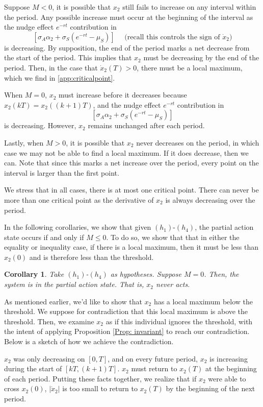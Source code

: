 \documentclass[preprint,12pt]{elsarticle}
\newtheorem{cor}{Corollary}
\begin{document}
Suppose $M < 0 $, it is possible that $x_2$ still fails to increase on any interval within the period. Any possible increase must occur at the beginning of the interval as the nudge effect $e^{-rt}$ contribution in \[
[\sigma_A\alpha_2 + \sigma_S(e^{-rt} - \mu_S)] \quad \text{ (recall this controls the sign of } \dot x_2)
\]
is decreasing. By supposition, the end of the period marks a net decrease from the start of the period. This implies that $x_2$ must be decreasing by the end of the period. Then, in the case that $\dot x_2(T) > 0$, there must be a local maximum, which we find in \ref{app:criticalpoint}. 



When $M = 0$, $x_2$ must increase before it decreases because $x_2(kT) =  x_2((k+1)T)$, and the nudge effect $e^{-rt}$ contribution in \[
[\sigma_A\alpha_2 + \sigma_S(e^{-rt} - \mu_S)]
\]
is decreasing. However, $x_2$ remains unchanged after each period.

Lastly, when $M>0$, it is possible that $x_2$ never decreases on the period, in which case we may not be able to find a local maximum. If it does decrease, then we can. Note that since this marks a net increase over the period, every point on the interval is larger than the first point. 

We stress that in all cases, there is at most one critical point. There can never be more than one critical point as the derivative of $x_2$ is always decreasing over the period. 

In the following corollaries, we show that given $(h_1)$-$(h_4)$, the partial action state occurs if and only if $M \leq 0$. To do so, we show that that in either the equality or inequality case, if there is a local maximum, then it must be less than $x_2(0)$ and is therefore less than the threshold. 

\begin{cor}\label{Cor: partialAction1}
   Take $(h_1)$-$(h_4)$ as hypotheses. Suppose $M = 0$. Then, the system is in the partial action state. That is, $x_2$ never acts. 
\end{cor}
As mentioned earlier, we'd like to show that $x_2$ has a local maximum below the threshold. We suppose for contradiction that this local maximum is above the threshold. Then, we examine $x_2$ as if this individual ignores the threshold, with the intent of applying Proposition \ref{Prop: invariant} to reach our contradiction. Below is a sketch of how we achieve the contradiction.

$x_2$ was only decreasing on $[0,T]$, and on every future period, $x_2$ is increasing during the  start of $[kT,(k+1)T]$. $x_2$ must return to $x_2(T)$ at the beginning of each period. Putting these facts together, we realize that if $x_2$ were able to cross $x_2(0)$, $|\dot x_2|$ is too small to return to $x_2(T)$ by the beginning of the next period.
\end{document}
